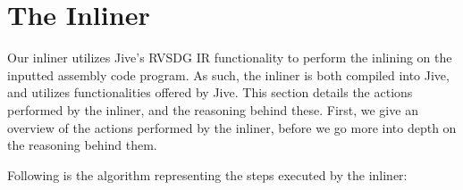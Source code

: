 
\clearpage
\section{The Inliner}
\label{sec:scheme}

Our inliner utilizes Jive's RVSDG IR functionality to perform the inlining on
the inputted assembly code program. As such, the inliner is both compiled into
Jive, and utilizes functionalities offered by Jive. This section details the
actions performed by the inliner, and the reasoning behind these. First, we give
an overview of the actions performed by the inliner, before we go more into
depth on the reasoning behind them.

Following is the algorithm representing the steps executed by the inliner:

